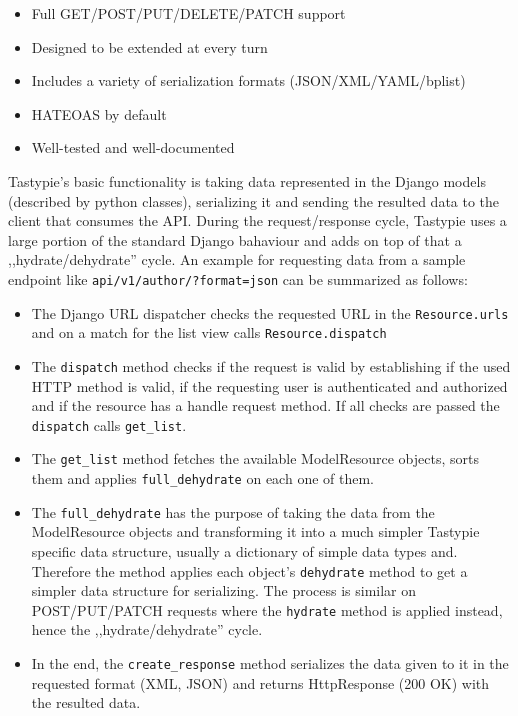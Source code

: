 \begin{itemize}
	\item Full GET/POST/PUT/DELETE/PATCH support
	\item Designed to be extended at every turn
	\item Includes a variety of serialization formats (JSON/XML/YAML/bplist)
	\item HATEOAS by default
	\item Well-tested and well-documented
\end{itemize}

Tastypie's basic functionality is taking data represented in the Django models (described by python classes), serializing it and sending the resulted data to the client that consumes the API. During the request/response cycle, Tastypie uses a large portion of the standard Django bahaviour and adds on top of that a ,,hydrate/dehydrate'' cycle. An example for requesting data from a sample endpoint like \texttt{api/v1/author/?format=json} can be summarized as follows:

\begin{itemize}
	\item The Django URL dispatcher checks the requested URL in the \texttt{Resource.urls} and on a match for the list view calls \texttt{Resource.dispatch}
	\item The \texttt{dispatch} method checks if the request is valid by establishing if the used HTTP method is valid, if the requesting user is authenticated and authorized and if the resource has a handle  request method. If all checks are passed the \texttt{dispatch} calls \texttt{get\_list}.
	\item The \texttt{get\_list} method fetches the available ModelResource objects, sorts them and applies \texttt{full\_dehydrate} on each one of them.
	\item The \texttt{full\_dehydrate} has the purpose of taking the data from the ModelResource objects and transforming it into a much simpler Tastypie specific data structure, usually a dictionary of simple data types and. Therefore the method applies each object's  \texttt{dehydrate} method to get a simpler data structure for serializing. The process is similar on  POST/PUT/PATCH requests where the \texttt{hydrate} method is applied instead, hence the ,,hydrate/dehydrate'' cycle.
	\item In the end, the \texttt{create\_response} method serializes the data given to it in the requested format (XML, JSON) and returns HttpResponse (200 OK) with the resulted data.
\end{itemize}


